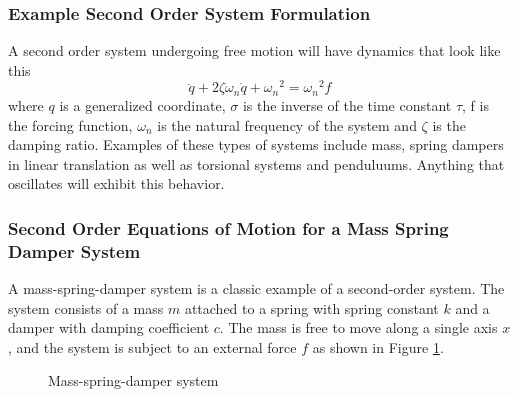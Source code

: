 \subsubsection{Example Second Order System Formulation}

A second order system undergoing free motion will have dynamics that look like this
\begin{equation}\label{e:second_order}
\ddot{q} + 2\zeta \omega_n \dot{q} + {\omega_n}^2 = {\omega_n}^2 f
\end{equation}
where $q$ is a generalized coordinate, $\sigma$ is the inverse of the time constant $\tau$, f is the forcing function, $\omega_n$ is the natural frequency of the system and $\zeta$ is the damping ratio. Examples of these types of systems include mass, spring dampers in linear translation as well as torsional systems and penduluums. Anything that oscillates will exhibit this behavior. 

\subsubsection{Second Order Equations of Motion for a Mass Spring Damper System}

A mass-spring-damper system is a classic example of a second-order system. The system consists of a mass $m$ attached to a spring with spring constant $k$ and a damper with damping coefficient $c$. The mass is free to move along a single axis $x$, and the system is subject to an external force $f$ as shown in Figure \ref{f:msd}.

\begin{figure}[H]
    \centering
    \caption{Mass-spring-damper system}
    \label{f:msd}
\end{figure}


